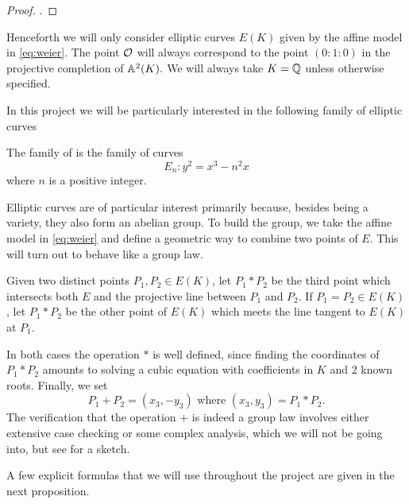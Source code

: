 \documentclass[12pt, a4paper]{report}
\begin{document}
\begin{proof}
  \cite[See][Chapter III, pages 42-43]{arithmetic}.
\end{proof}

Henceforth we will only consider elliptic curves $E(K)$
given by the affine model in \autoref{eq:weier}. The
point ${\mathcal O}$ will always correspond to the point $(0:1:0)$ in the projective
completion of $\mathbb{A}^2(K).$
We will always take $K = {\mathbb Q}$ unless otherwise specified.

In this project we will be particularly interested in the following family
of elliptic curves

\begin{defn}
  The family of  is the family of curves
  \begin{equation} \label{eq:twist}
    E_n : y^2 = x^3 - n^2 x
  \end{equation}
  where $n$ is a positive integer.
\end{defn}

Elliptic curves are of particular interest primarily because, besides being
a variety, they also form an abelian group. To build the group, we take the
affine model in 
\autoref{eq:weier} and define a geometric way to combine two points of $E$. This
will turn out to behave like a group law.

Given two distinct points $P_1, P_2 \in E(K)$, let $P_1 * P_2$ be the third point
which intersects both $E$ and the projective line between $P_1$ and $P_2$. 
If $P_1 = P_2 \in E(K)$, let $P_1 * P_2$ be the other point of $E(K)$ which
meets the line tangent to $E(K)$ at $P_1.$

In both cases the operation $*$ is well defined,
since finding the coordinates of $P_1 * P_2$ amounts to solving
a cubic equation with coefficients in $K$ and 2 known roots.
Finally, we set
\[P_1 + P_2 = (x_3, -y_3) \text{ where } (x_3,y_3) = P_1 * P_2.\]
The verification that the operation $+$ is indeed a group law involves either
extensive case checking or
some complex analysis, which we will not be going into, but see
\cite[129-137]{Granville} for a sketch.

A few explicit formulas that we will use throughout the project
are given in the next proposition. 
\end{document}
